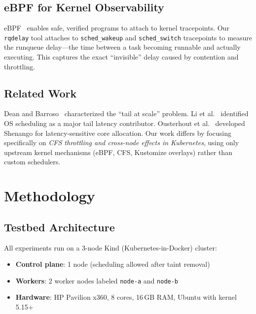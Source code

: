 \documentclass[11pt,a4paper]{article}
\begin{document}
\subsection{eBPF for Kernel Observability}

eBPF~\cite{starovoitov2014ebpf} enables safe, verified programs to attach to kernel tracepoints. Our \texttt{rqdelay} tool attaches to \texttt{sched\_wakeup} and \texttt{sched\_switch} tracepoints to measure the runqueue delay---the time between a task becoming runnable and actually executing. This captures the exact ``invisible'' delay caused by contention and throttling.

\subsection{Related Work}

Dean and Barroso~\cite{dean2013tail} characterized the ``tail at scale'' problem. Li et al.~\cite{li2014tales} identified OS scheduling as a major tail latency contributor. Ousterhout et al.~\cite{ousterhout2019shenango} developed Shenango for latency-sensitive core allocation. Our work differs by focusing specifically on \emph{CFS throttling and cross-node effects in Kubernetes}, using only upstream kernel mechanisms (eBPF, CFS, Kustomize overlays) rather than custom schedulers.


\section{Methodology}
\label{sec:methodology}

\subsection{Testbed Architecture}

All experiments run on a 3-node Kind (Kubernetes-in-Docker) cluster:

\begin{itemize}[leftmargin=*]
  \item \textbf{Control plane}: 1 node (scheduling allowed after taint removal)
  \item \textbf{Workers}: 2 worker nodes labeled \texttt{node-a} and \texttt{node-b}
  \item \textbf{Hardware}: HP Pavilion x360, 8 cores, 16\,GB RAM, Ubuntu with kernel 5.15+
\end{itemize}
\end{document}
